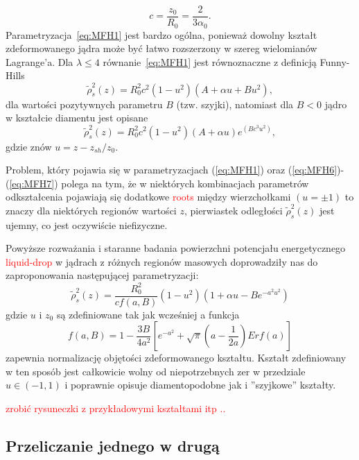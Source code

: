 \documentclass[polish]{article}
\numberwithin{equation}{section}
\begin{document}
\begin{equation} \label{eq:MFH5}
c=\frac{z_{0}}{R_{0}}=\frac{2}{3\alpha_{0}}.
\end{equation}
Parametryzacja~\ref{eq:MFH1} jest bardzo ogólna, ponieważ dowolny kształt zdeformowanego jądra może być łatwo rozszerzony w szereg wielomianów Lagrange'a. Dla $\lambda\leq4$ równanie~\ref{eq:MFH1} jest równoznaczne z definicją Funny-Hills
\begin{equation} \label{eq:MFH6}
\tilde{\rho}^{2}_{s}(z)=R_{0}^{2}c^{2}(1-u^{2})(A+\alpha u+Bu^{2}),
\end{equation}
dla wartości pozytywnych parametru $B$ (tzw. szyjki), natomiast dla $B<0$ jądro w kształcie diamentu jest opisane
\begin{equation} \label{eq:MFH7}
\tilde{\rho}^{2}_{s}(z)=R_{0}^{2}c^{2}(1-u^{2})(A+\alpha u)e^{(Bc^{3}u^{2})},
\end{equation}
gdzie znów $u=z-z_{sh}/z_{0}$.

Problem, który pojawia się w parametryzacjach (\ref{eq:MFH1}) oraz (\ref{eq:MFH6})-(\ref{eq:MFH7}) polega na tym, że w niektórych kombinacjach parametrów odkształcenia pojawiają się dodatkowe \textcolor{red}{roots} między wierzchołkami $(u=\pm1)$ to znaczy dla niektórych regionów wartości $z$, pierwiastek odległości $\tilde{\rho}^{2}_{s}(z)$ jest ujemny, co jest oczywiście niefizyczne.

Powyższe rozważania i staranne badania powierzchni potencjału energetycznego \textcolor{red}{liquid-drop} w jądrach z różnych regionów masowych doprowadziły nas do zaproponowania następującej parametryzacji:
\begin{equation}
\tilde{\rho}^{2}_{s}(z)=\frac{R_{0}^{2}}{c f(a,B)}(1-u^{2})(1+\alpha u-Be^{-a^{2}u^{2}})
\end{equation}
gdzie $u$ i $z_{0}$ są zdefiniowane tak jak wcześniej a funkcja
\begin{equation}
f(a,B)=1-\frac{3B}{4a^{2}}\left[e^{-a^{2}}+\sqrt{\pi}(a-\frac{1}{2a})Erf(a)\right]
\end{equation}
zapewnia normalizację objętości zdeformowanego kształtu. Kształt zdefiniowany w ten sposób jest całkowicie wolny od niepotrzebnych zer w przedziale $u\in (-1,1)$ i poprawnie opisuje diamentopodobne jak i ''szyjkowe'' kształty.

\bigskip
\textcolor{red}{zrobić rysuneczki z przykładowymi kształtami itp ..}

\subsection{Przeliczanie jednego w drugą}
\end{document}
